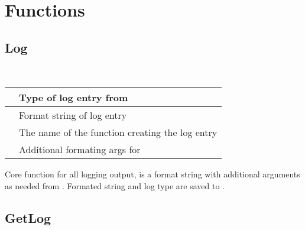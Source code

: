 \documentclass[letterpaper,10pt,english]{sphinxmanual}
\begin{document}
\section{Functions}
\label{\detokenize{log:functions}}

\subsection{Log}
\label{\detokenize{log:log}}

\begin{fulllineitems}
\label{\detokenize{log:_CPPv2N6pessum3LogEiNSt6stringENSt6stringEz}}%
\pysigstartmultiline
{}%
\pysigstopmultiline~

\begin{savenotes}\sphinxattablestart
\centering
\begin{tabulary}{\linewidth}[t]{|T|T|}
\hline

&
Type of log entry from {\hyperref[\detokenize{log:_CPPv2N6pessum7LogTypeE}]{}}
\\
\hline
{}
&
Format string of log entry
\\
\hline
{}
&
The name of the function creating the log entry
\\
\hline
{}
&
Additional formating args for 
\\
\hline
\end{tabulary}
\par
\sphinxattableend\end{savenotes}

Core function for all logging output,  is a format string with
additional arguments as needed from . Formated string and log type
are saved to {\hyperref[\detokenize{log:_CPPv2N6pessum11global_logsE}]{}}.

\end{fulllineitems}



\subsection{GetLog}
\label{\detokenize{log:getlog}}
\end{document}

